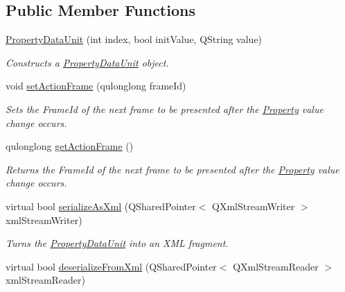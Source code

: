 \subsection*{Public Member Functions}
\begin{DoxyCompactItemize}
\item 
\hyperlink{class_picto_1_1_property_data_unit_ac79e8114c6ddee2ca640cd1892fe1412}{Property\-Data\-Unit} (int index, bool init\-Value, Q\-String value)
\begin{DoxyCompactList}\small\item\em Constructs a \hyperlink{class_picto_1_1_property_data_unit}{Property\-Data\-Unit} object. \end{DoxyCompactList}\item 
\hypertarget{class_picto_1_1_property_data_unit_a2b3f546d713a3fbac846003a6d881657}{void \hyperlink{class_picto_1_1_property_data_unit_a2b3f546d713a3fbac846003a6d881657}{set\-Action\-Frame} (qulonglong frame\-Id)}\label{class_picto_1_1_property_data_unit_a2b3f546d713a3fbac846003a6d881657}

\begin{DoxyCompactList}\small\item\em Sets the Frame\-Id of the next frame to be presented after the \hyperlink{class_picto_1_1_property}{Property} value change occurs. \end{DoxyCompactList}\item 
\hypertarget{class_picto_1_1_property_data_unit_aae99d6686027fc64bca58ac67e4272b6}{qulonglong \hyperlink{class_picto_1_1_property_data_unit_aae99d6686027fc64bca58ac67e4272b6}{get\-Action\-Frame} ()}\label{class_picto_1_1_property_data_unit_aae99d6686027fc64bca58ac67e4272b6}

\begin{DoxyCompactList}\small\item\em Returns the Frame\-Id of the next frame to be presented after the \hyperlink{class_picto_1_1_property}{Property} value change occurs. \end{DoxyCompactList}\item 
\hypertarget{class_picto_1_1_property_data_unit_a95e9094b43ea437e1abf6c6067afb0c3}{virtual bool \hyperlink{class_picto_1_1_property_data_unit_a95e9094b43ea437e1abf6c6067afb0c3}{serialize\-As\-Xml} (Q\-Shared\-Pointer$<$ Q\-Xml\-Stream\-Writer $>$ xml\-Stream\-Writer)}\label{class_picto_1_1_property_data_unit_a95e9094b43ea437e1abf6c6067afb0c3}

\begin{DoxyCompactList}\small\item\em Turns the \hyperlink{class_picto_1_1_property_data_unit}{Property\-Data\-Unit} into an X\-M\-L fragment. \end{DoxyCompactList}\item 
\hypertarget{class_picto_1_1_property_data_unit_a9fdfa4591dac16beb4120afb010db5e5}{virtual bool \hyperlink{class_picto_1_1_property_data_unit_a9fdfa4591dac16beb4120afb010db5e5}{deserialize\-From\-Xml} (Q\-Shared\-Pointer$<$ Q\-Xml\-Stream\-Reader $>$ xml\-Stream\-Reader)}\label{class_picto_1_1_property_data_unit_a9fdfa4591dac16beb4120afb010db5e5}


\end{DoxyCompactItemize}
